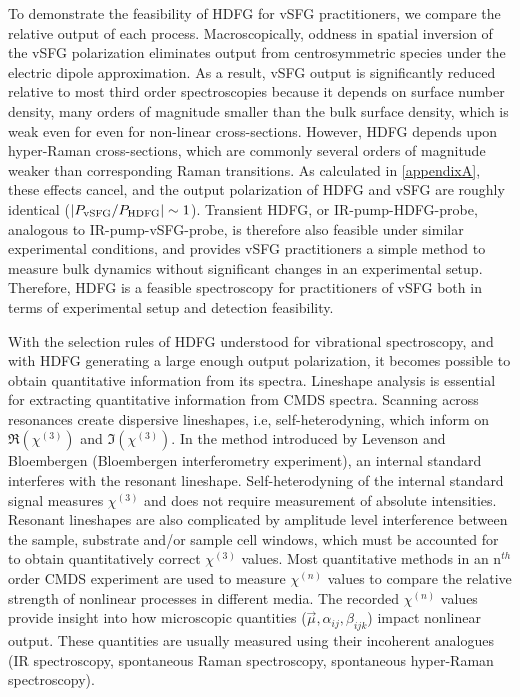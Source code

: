 \documentclass[aip, jcp, reprint, onecolumn]{revtex4-2}
\begin{document}
To demonstrate the feasibility of HDFG for vSFG practitioners, we compare the relative output of each process. 
Macroscopically, oddness in spatial inversion of the vSFG polarization eliminates output from centrosymmetric species under the electric dipole approximation.\cite{RN132, RN133}
As a result, vSFG output is significantly reduced relative to most third order spectroscopies because it depends on surface number density, many orders of magnitude smaller than the bulk surface density, which is weak even for even for non-linear cross-sections.
However, HDFG depends upon hyper-Raman cross-sections, which are commonly several orders of magnitude weaker than corresponding Raman transitions.\cite{RN515}
As calculated in \autoref{appendixA}, these effects cancel, and the output polarization of HDFG and vSFG are roughly identical ($\abs{P_\text{vSFG} / P_\text{HDFG}} \sim 1$).
Transient HDFG, or IR-pump-HDFG-probe, analogous to IR-pump-vSFG-probe, is therefore also feasible under similar experimental conditions, and provides vSFG practitioners a simple method to measure bulk dynamics without significant changes in an experimental setup. 
Therefore, HDFG is a feasible spectroscopy for practitioners of vSFG both in terms of experimental setup and detection feasibility.

With the selection rules of HDFG understood for vibrational spectroscopy, and with HDFG generating a large enough output polarization, it becomes possible to obtain quantitative information from its spectra.
Lineshape analysis is essential for extracting quantitative information from CMDS spectra.
Scanning across resonances create dispersive lineshapes, i.e, self-heterodyning, which inform on $\Re(\chi^{(3)})$ and $\Im(\chi^{(3)})$.\cite{Levenson1974_1, Levenson1974_2}
In the method introduced by Levenson and Bloembergen (Bloembergen interferometry experiment), an internal standard interferes with the resonant lineshape.
Self-heterodyning of the internal standard signal measures $\chi^{(3)}$ and does not require measurement of absolute intensities. 
Resonant lineshapes are also complicated by amplitude level interference between the sample,  substrate and/or sample cell windows, which must be accounted for to obtain quantitatively correct $\chi^{(3)}$ values. \cite{RN362, RN418}
Most quantitative methods in an n$^{th}$ order CMDS experiment are used to measure $\chi^{(n)}$ values to compare the relative strength of nonlinear processes in different media. \cite{Zhu87, RN351, RN345}
The recorded $\chi^{(n)}$ values provide insight into how microscopic quantities ($\vec{\mu}, \alpha_{ij}, \beta_{ijk}$) impact nonlinear output.
These quantities are usually measured using their incoherent analogues (IR spectroscopy, spontaneous Raman spectroscopy, spontaneous hyper-Raman spectroscopy). \cite{Levenson1974_2, RN412, Shoute2005}
\end{document}
